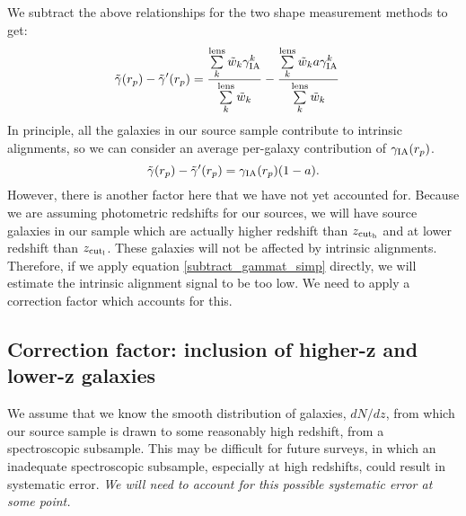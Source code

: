 \documentclass[onecolumn,amsmath,aps,fleqn, superscriptaddress]{revtex4}
\begin{document}
We subtract the above relationships for the two shape measurement methods to get:
\begin{align}
\tilde{\gamma}(r_p) - \tilde{\gamma}^\prime(r_p) &= \frac{\sum\limits_{k}^{\rm lens} \tilde{w}_k \gamma_{\rm IA}^k}{\sum\limits_{k}^{\rm lens} \tilde{w}_k} - \frac{\sum\limits_{k}^{\rm lens} \tilde{w}_k a \gamma_{\rm IA}^k}{\sum\limits_{k}^{\rm lens} \tilde{w}_k} 
\label{subtract_gammat}
\end{align}
In principle, all the galaxies in our source sample contribute to intrinsic alignments, so we can consider an average per-galaxy contribution of $\gamma_{\rm IA}(r_p)$.
\begin{equation}
\tilde{\gamma}(r_p) - \tilde{\gamma}^\prime(r_p) = \gamma_{\rm IA}(r_p)(1-a).
\label{subtract_gammat_simp}
\end{equation}
However, there is another factor here that we have not yet accounted for. Because we are assuming photometric redshifts for our sources, we will have source galaxies in our sample which are actually higher redshift than $z_{\rm cut_h}$ and at lower redshift than $z_{\rm cut_l}$. These galaxies will not be affected by intrinsic alignments. Therefore, if we apply equation \ref{subtract_gammat_simp} directly, we will estimate the intrinsic alignment signal to be too low. We need to apply a correction factor which accounts for this. 

\subsection*{Correction factor: inclusion of higher-z and lower-z galaxies}
We assume that we know the smooth distribution of galaxies, $dN / dz$, from which our source sample is drawn to some reasonably high redshift, from a spectroscopic subsample. This may be difficult for future surveys, in which an inadequate spectroscopic subsample, especially at high redshifts, could result in systematic error. {\it We will need to account for this possible systematic error at some point.}
\end{document}
